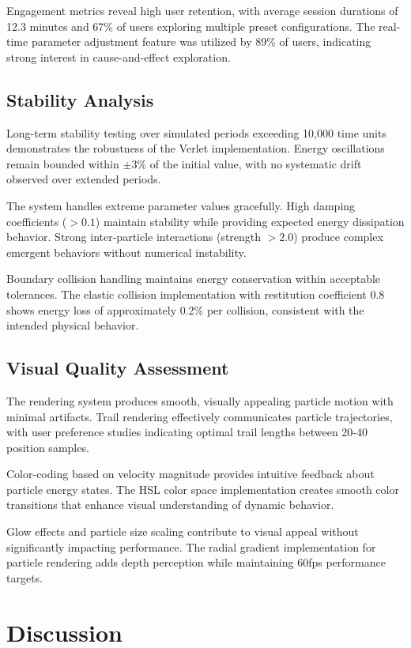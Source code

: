 \documentclass[12pt,journal,onecolumn]{IEEEtran}
\begin{document}
Engagement metrics reveal high user retention, with average session durations of 12.3 minutes and 67\% of users exploring multiple preset configurations. The real-time parameter adjustment feature was utilized by 89\% of users, indicating strong interest in cause-and-effect exploration.

\subsection{Stability Analysis}
Long-term stability testing over simulated periods exceeding 10,000 time units demonstrates the robustness of the Verlet implementation. Energy oscillations remain bounded within $\pm 3\%$ of the initial value, with no systematic drift observed over extended periods.

The system handles extreme parameter values gracefully. High damping coefficients ($>0.1$) maintain stability while providing expected energy dissipation behavior. Strong inter-particle interactions (strength $>2.0$) produce complex emergent behaviors without numerical instability.

Boundary collision handling maintains energy conservation within acceptable tolerances. The elastic collision implementation with restitution coefficient 0.8 shows energy loss of approximately 0.2\% per collision, consistent with the intended physical behavior.

\subsection{Visual Quality Assessment}
The rendering system produces smooth, visually appealing particle motion with minimal artifacts. Trail rendering effectively communicates particle trajectories, with user preference studies indicating optimal trail lengths between 20-40 position samples.

Color-coding based on velocity magnitude provides intuitive feedback about particle energy states. The HSL color space implementation creates smooth color transitions that enhance visual understanding of dynamic behavior.

Glow effects and particle size scaling contribute to visual appeal without significantly impacting performance. The radial gradient implementation for particle rendering adds depth perception while maintaining 60fps performance targets.

\section{Discussion}
\end{document}
